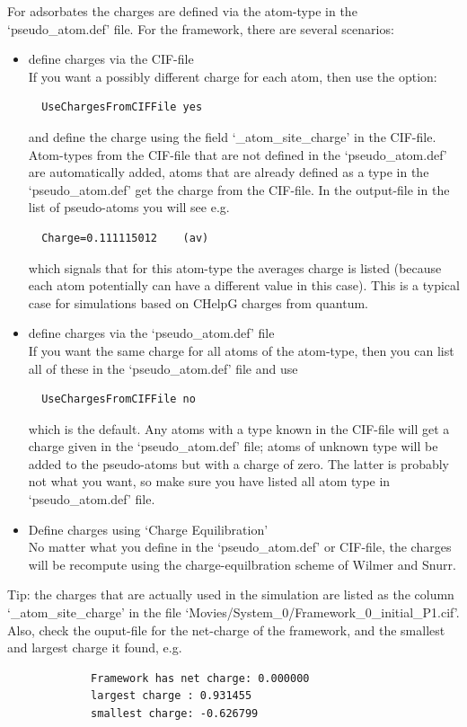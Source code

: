 For adsorbates the charges are defined via the atom-type in the `pseudo\_atom.def' file.
For the framework, there are several scenarios:
\begin{itemize}
\item{define charges via the CIF-file}\\
If you want a possibly different charge for each atom, then use the option:
\begin{verbatim}
  UseChargesFromCIFFile yes
\end{verbatim}
and define the charge using the field `\_atom\_site\_charge' in the CIF-file.
Atom-types from the CIF-file that are not defined in the `pseudo\_atom.def' are automatically added, atoms that are already defined as a type in
the `pseudo\_atom.def' get the charge from the CIF-file. In the output-file in the list of pseudo-atoms you will see e.g.
\begin{verbatim}
  Charge=0.111115012    (av)
\end{verbatim}
which signals that for this atom-type the averages charge is listed (because each atom potentially can have a different value in this case).
This is a typical case for simulations based on CHelpG charges from quantum.
\item{define charges via the `pseudo\_atom.def' file}\\
If you want the same charge for all atoms of the atom-type, then you can list all of these in the `pseudo\_atom.def' file and use
\begin{verbatim}
  UseChargesFromCIFFile no
\end{verbatim}
which is the default. Any atoms with a type known in the CIF-file will get a charge given in the `pseudo\_atom.def' file; atoms of unknown type
will be added to the pseudo-atoms but with a charge of zero. The latter is probably not what you want, so make sure you have listed all atom type in `pseudo\_atom.def' file.
\item{Define charges using `Charge Equilibration'}\\
No matter what you define in the `pseudo\_atom.def' or CIF-file, the charges will be recompute using the charge-equilbration scheme of Wilmer and Snurr.
\end{itemize}

\begin{center}
\begin{shadedbox}
Tip: the charges that are actually used in the simulation are listed as the column `\_atom\_site\_charge'
in the file `Movies/System\_0/Framework\_0\_initial\_P1.cif'.
 Also, check the ouput-file for the net-charge of the framework, and the smallest and largest charge it found, e.g.\
           \begin{verbatim}
             Framework has net charge: 0.000000
             largest charge : 0.931455
             smallest charge: -0.626799
           \end{verbatim}
\end{shadedbox}
\end{center}

